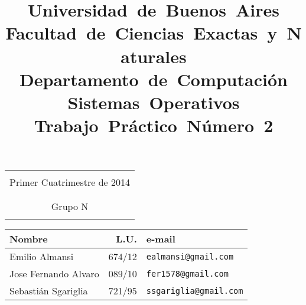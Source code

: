 \title{
	\mbox{\Huge Universidad de Buenos Aires}\\
	\mbox{\LARGE Facultad de Ciencias Exactas y Naturales}\\
	\mbox{\LARGE Departamento de Computación}\\
	\mbox{\LARGE Sistemas Operativos}\\
	\mbox{Trabajo Práctico Número 2}\\
}

\date{}

\maketitle

\thispagestyle{empty}

\begin{center}
	\begin{tabular}{c}
		\hline
		\\
		Primer Cuatrimestre de 2014\\
		\\
		\hline
		\\
		Grupo N 
		\\
		\\
	\end{tabular}

	\begin{tabular}{|l|r|l|}
		\hline
		\textbf{Nombre} & \textbf{L.U.} & \textbf{e-mail}\\
		\hline
		Emilio Almansi & 674/12 & \verb"ealmansi@gmail.com"\\
		\hline
		Jose Fernando Alvaro & 089/10 & \verb"fer1578@gmail.com"\\
		\hline
		Sebastián Sgariglia & 721/95 & \verb"ssgariglia@gmail.com"\\
		\hline
	\end{tabular}
\end{center}

\vskip 5mm


